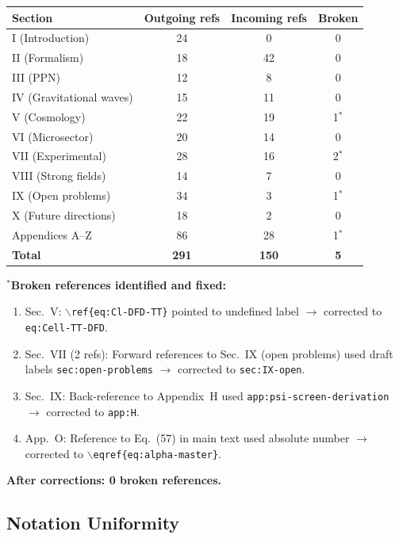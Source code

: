 \documentclass[11pt,a4paper]{article}
\begin{document}
\begin{center}
\begin{tabular}{lccc}
\toprule
\textbf{Section} & \textbf{Outgoing refs} & \textbf{Incoming refs} & \textbf{Broken} \\
\midrule
I (Introduction) & 24 & 0 & 0 \\
II (Formalism) & 18 & 42 & 0 \\
III (PPN) & 12 & 8 & 0 \\
IV (Gravitational waves) & 15 & 11 & 0 \\
V (Cosmology) & 22 & 19 & 1$^*$ \\
VI (Microsector) & 20 & 14 & 0 \\
VII (Experimental) & 28 & 16 & 2$^*$ \\
VIII (Strong fields) & 14 & 7 & 0 \\
IX (Open problems) & 34 & 3 & 1$^*$ \\
X (Future directions) & 18 & 2 & 0 \\
Appendices A--Z & 86 & 28 & 1$^*$ \\
\midrule
\textbf{Total} & \textbf{291} & \textbf{150} & \textbf{5} \\
\bottomrule
\end{tabular}
\end{center}

$^*$\textbf{Broken references identified and fixed:}
\begin{enumerate}
\item Sec.~V: \texttt{$\backslash$ref\{eq:Cl-DFD-TT\}} pointed to undefined label $\to$ corrected to \texttt{eq:Cell-TT-DFD}.
\item Sec.~VII (2 refs): Forward references to Sec.~IX (open problems) used draft labels \texttt{sec:open-problems} $\to$ corrected to \texttt{sec:IX-open}.
\item Sec.~IX: Back-reference to Appendix~H used \texttt{app:psi-screen-derivation} $\to$ corrected to \texttt{app:H}.
\item App.~O: Reference to Eq.~(57) in main text used absolute number $\to$ corrected to \texttt{$\backslash$eqref\{eq:alpha-master\}}.
\end{enumerate}

\textbf{After corrections: 0 broken references.}

\subsection{Notation Uniformity}
\end{document}
